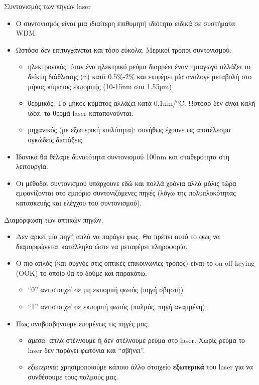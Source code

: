 \documentclass[11pt,aspectratio=169]{beamer}
\begin{document}
\begin{frame}[shrink=20,t]{Συντονισμός των πηγών laser}
\begin{itemize}
\item Ο συντονισμός είναι μια ιδιαίτερη επιθυμητή ιδιότητα ειδικά σε συστήματα WDM.
\item Ωστόσο δεν επιτυγχάνεται και τόσο εύκολα. Μερικοί τρόποι συντονισμού:
\begin{itemize}
\item ηλεκτρονικός: όταν ένα ηλεκτρικό ρεύμα διαρρέει έναν ημιαγωγό αλλάζει το δείκτη διάθλασης (n) κατά 0.5\%-2\% και επιφέρει μία ανάλογε μεταβολή στο μήκος κύματος εκπομπής (10-15nm στα 1.55μm)
\item θερμικός: Το μήκος κύματος αλλάζει κατά 0.1nm/$^{\text{o}}$C. Ωστόσο δεν είναι καλή ιδέα, τα θερμά laser καταπονούνται.
\item μηχανικός (με εξωτερική κοιλότητα): συνήθως έχουνε ως αποτέλεσμα ογκώδεις διατάξεις.
\end{itemize}
\item Ιδανικά θα θέλαμε δυνατότητα συντονισμού 100nm και σταθερότητα στη λειτουργία.
\item Οι μέθοδοι συντονισμού υπάρχουνε εδώ και πολλά χρόνια αλλά μόλις τώρα εμφανίζονται στο εμπόριο συντονιζόμενες πηγές (λόγω της πολυπλοκότητας κατασκευής και ελέγχου του συντονισμού).
\end{itemize}
\end{frame}

\begin{frame}[shrink=10,t]{Διαμόρφωση των οπτικών πηγών.}
\begin{itemize}
\item Δεν αρκεί μία πηγή απλά να παράγει φως. Θα πρέπει αυτό το φως να διαμορφώνεται κατάλληλα ώστε να μεταφέρει πληροφορία.
\item Ο πιο απλός (και συχνός στις οπτικές επικοινωνίες τρόπος) είναι το on-off keying (ΟΟΚ) το οποίο θα το δούμε και παρακάτω.
\begin{itemize}
\item “0” αντιστοιχεί σε μη εκπομπή φωτός (πηγή σβηστή)
\item “1” αντιστοιχεί σε εκπομπή φωτός (παλμός, πηγή αναμμένη).
\end{itemize}
\item Πως αναβοσβήνουμε επομένως τις πηγές μας;
\begin{itemize}
\item \textit{άμεσα}: απλά στέλνουμε ή δεν στέλνουμε ρεύμα στο laser. Χωρίς ρεύμα το laser δεν παράγει φωτόνια και “σβήνει”.
\item \textit{εξωτερικά}: χρησιμοποιούμε κάποιο άλλο στοιχείο \textbf{εξωτερικά} του laser για να συνθέσουμε τους παλμούς μας.
\end{itemize}
\end{itemize}
\end{frame}
\end{document}
